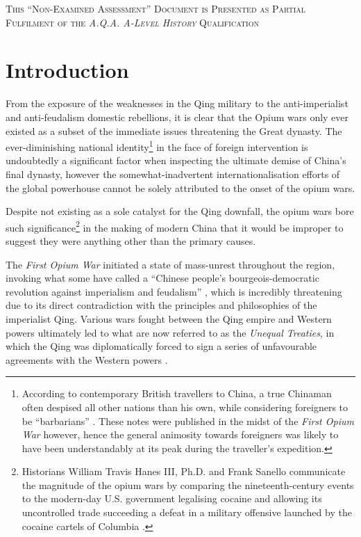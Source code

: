 \documentclass{article}
\newcommand{\textrule}{\noindent\makebox[\linewidth]{\rule{\linewidth}{0.4pt}}}
\begin{document}
\textrule%
\vspace*{0.6em}
{\centering \textsc{This ``Non-Examined Assessment'' Document is Presented as Partial Fulfilment of the \textit{A.Q.A. A-Level History} Qualification}\\}
\textrule%

\section{Introduction}

        From the exposure of the weaknesses in the Qing military to the anti-imperialist and anti-feudalism domestic rebellions, it is clear that the Opium wars only ever existed as a subset of the immediate issues threatening the Great dynasty. The ever-diminishing national identity\footnote{According to contemporary British travellers to China, a true Chinaman often despised all other nations than his own, while considering foreigners to be ``barbarians'' \autocite{McPherson:1842}. These notes were published in the midst of the \textit{First Opium War} however, hence the general animosity towards foreigners was likely to have been understandably at its peak during the traveller's expedition.} in the face of foreign intervention is undoubtedly a significant factor when inspecting the ultimate demise of China's final dynasty, however the somewhat-inadvertent internationalisation efforts of the global powerhouse cannot be solely attributed to the onset of the opium wars.

        Despite not existing as a sole catalyst for the Qing downfall, the opium wars bore such significance\footnote{Historians William Travis Hanes III, Ph.D. and Frank Sanello communicate the magnitude of the opium wars by comparing the nineteenth-century events to the modern-day U.S. government legalising cocaine and allowing its uncontrolled trade succeeding a defeat in a military offensive launched by the cocaine cartels of Columbia \autocite{Hanes:2004}.} in the making of modern China that it would be improper to suggest they were anything other than the primary causes.

        The \textit{First Opium War} initiated a state of mass-unrest throughout the region, invoking what some have called a ``Chinese people's bourgeois-democratic revolution against imperialism and feudalism'' \autocite{Janin:1999}, which is incredibly threatening due to its direct contradiction with the principles and philosophies of the imperialist Qing. Various wars fought between the Qing empire and Western powers ultimately led to what are now referred to as the \textit{Unequal Treaties}, in which the Qing was diplomatically forced to sign a series of unfavourable agreements with the Western powers \autocite{Wang:2005}.
\end{document}
